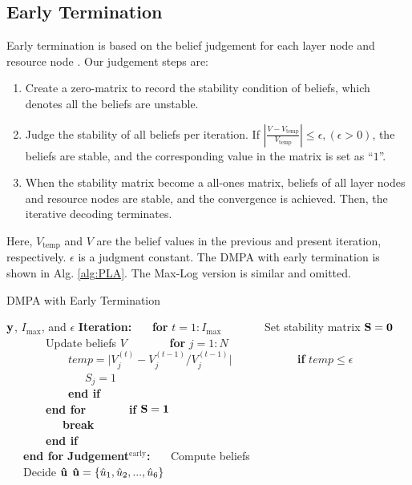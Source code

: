 \documentclass[journal,twoside]{IEEEtran}
\begin{document}
\subsection{Early Termination}
Early termination is based on the belief judgement for each layer node and resource node \cite{chen2005improved}.
Our judgement steps are:
\begin{enumerate}
  \item Create a zero-matrix to record the stability condition of beliefs, which denotes all the beliefs are unstable.
  \item Judge the stability of all beliefs per iteration. If $| \frac{V-V_\text{temp}}{V_\text{temp}} | \leq \epsilon,(\epsilon > 0)$, the beliefs are stable, and the corresponding value in the matrix is set as ``$1$''.
  \item When the stability matrix become a all-ones matrix, beliefs of all layer nodes and resource nodes are stable, and the convergence is achieved. Then, the iterative decoding terminates.
\end{enumerate}
Here, $V_\text{temp}$ and $V$ are the belief values in the previous and present iteration, respectively. $\epsilon$ is a judgment constant. The DMPA with early termination is shown in Alg. \ref{alg:PLA}. The Max-Log version is similar and omitted.
\begin{algorithm}[htbp]
\caption{DMPA with Early Termination}
\label{alg:PLA}
\begin{algorithmic}[1]
\Require
$\bf{y}$,
$I_{\mathrm{max}}$,
and $\epsilon$
\State
\textbf{Iteration:}
\State
\ \ \ \textbf{for} $t=1:I_{\mathrm{max}}$
\State
\ \ \ \ \ \ \ Set stability matrix $\bf{S} = \bf{0}$
\State
\ \ \ \ \ \ \ Update beliefs $V$
\State
\ \ \ \ \ \ \ \textbf{for} $j=1:N$\\
\ \ \ \ \ \ \ \ \ \ \ $temp = \big |V_{j}^{(t)}-V_{j}^{(t-1)} / V_{j}^{(t-1)} \big|$
\State
\ \ \ \ \ \ \ \ \ \ \ \textbf{if} $temp \leq \epsilon$\\
\ \ \ \ \ \ \ \ \ \ \ \ \ \ $S_{j} = 1$\\
\ \ \ \ \ \ \ \ \ \ \ \textbf{end if}\\
\ \ \ \ \ \ \ \textbf{end for}
\State
\ \ \ \ \ \ \ \textbf{if} $\bf{S} = \bf{1}$\\
\ \ \ \ \ \ \ \ \ \ \textbf{break}\\
\ \ \ \ \ \ \ \textbf{end if}\\
\ \ \ \textbf{end for}
\State
\textbf{Judgement$^{\text{early}}$:}
\State
\ \ \ Compute beliefs \\
\ \ \ Decide $\bf{\hat{u}}$
\Ensure
${\bf{\hat{u}}} = \{\hat{u}_{1}, \hat{u}_{2}, ..., \hat{u}_{6}\}$
\end{algorithmic}
\end{algorithm}
\end{document}
